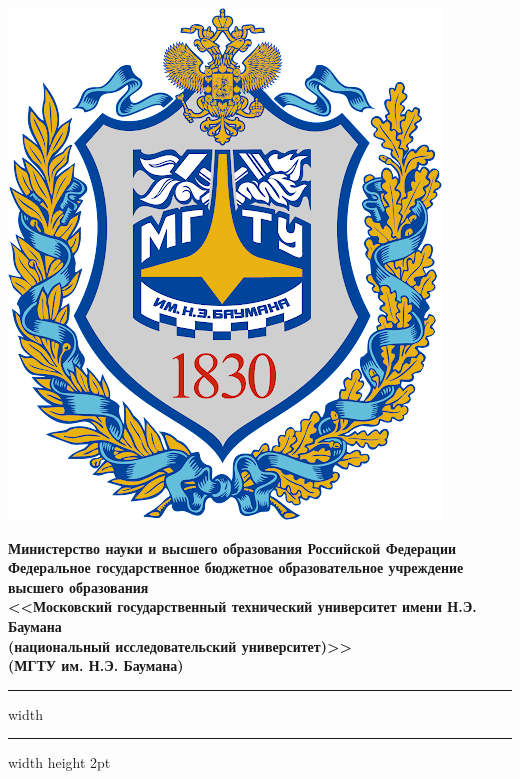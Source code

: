 \begin{titlepage}
	
\thispagestyle{empty}


\begin{minipage}{0.13\textwidth}
	\noindent\includegraphics[width=\linewidth]{assets/bmstu-logo.png}
\end{minipage}
\hfill
\begin{minipage}{0.85\textwidth}
	\begin{center}
		\fontsize{11pt}{0.3\baselineskip}\selectfont\noindent \textbf{Министерство науки и высшего образования Российской Федерации \\ 
		Федеральное государственное бюджетное образовательное учреждение \\
		высшего образования \\
		<<Московский государственный технический университет имени Н.Э. Баумана \\
		(национальный исследовательский университет)>> \\ 
		(МГТУ им. Н.Э. Баумана)}
	\end{center}
\end{minipage}
\hfill
\vspace{0.5\baselineskip}
\noindent \hrule width \textwidth \kern 1.5mm \hrule width \textwidth height 2pt 


\end{titlepage}
